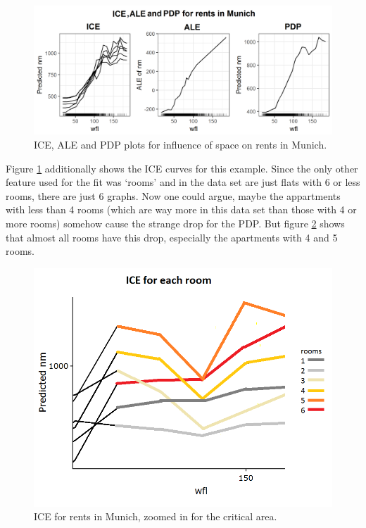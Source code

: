 \documentclass[
]{krantz}
\begin{document}
\begin{figure}
\includegraphics[width=1\linewidth]{images/ale_1_rf_rent_for_rooms_and_wfl_ALE_vs_ICE} \caption{ICE, ALE and PDP plots for influence of space on rents in Munich.}\label{fig:aleIceRents}
\end{figure}



Figure \ref{fig:aleIceRents} additionally shows the ICE curves for this example. Since the only other feature used for the fit was `rooms' and in the data set are just flats with 6 or less rooms, there are just 6 graphs. Now one could argue, maybe the appartments with less than 4 rooms (which are way more in this data set than those with 4 or more rooms) somehow cause the strange drop for the PDP. But figure \ref{fig:iceZoomedRents} shows that almost all rooms have this drop, especially the apartments with 4 and 5 rooms.

\begin{figure}
\includegraphics[width=1\linewidth]{images/ale_1_ice_zoomed} \caption{ICE for rents in Munich, zoomed in for the critical area.}\label{fig:iceZoomedRents}
\end{figure}
\end{document}
